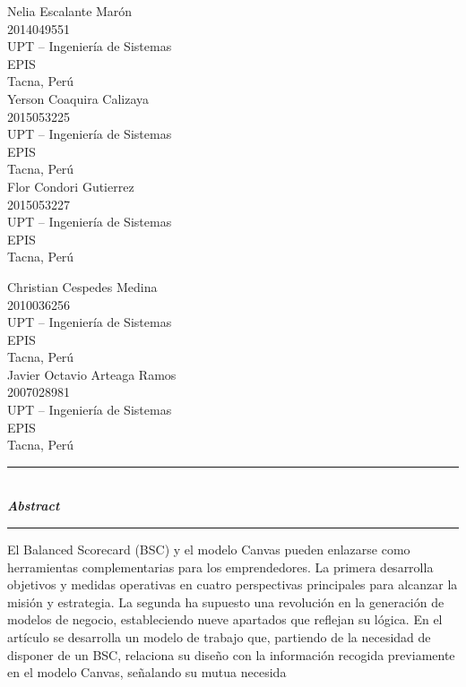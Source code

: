 \documentclass[10pt,a4paper]{article}
\begin{document}
		\begin{multicols}{2}
			\small
			\begin{center}
				Nelia Escalante Marón\\
				2014049551\\
				UPT – Ingeniería de Sistemas\\
				EPIS\\
				Tacna, Perú\\
				\vspace{\baselineskip}
				Yerson Coaquira Calizaya\\
				2015053225\\
				UPT – Ingeniería de Sistemas\\  
				EPIS\\
				Tacna, Perú\\                 
				\vspace{\baselineskip}
				Flor Condori Gutierrez\\
				2015053227\\
				UPT – Ingeniería de Sistemas\\  
				EPIS\\	
				Tacna, Perú\\                 
				\columnbreak
				
				\vspace{\baselineskip}
				Christian Cespedes Medina\\
				2010036256\\
				UPT – Ingeniería de Sistemas\\  
				EPIS\\	
				Tacna, Perú\\                 

				\vspace{\baselineskip}
				Javier Octavio Arteaga Ramos \\
				2007028981\\
				UPT – Ingeniería de Sistemas\\  
				EPIS\\	
				Tacna, Perú\\                 

			\end{center}
			\normalsize			
		\end{multicols}
		\vspace{\baselineskip}
	
		\rule{167mm}{0.1mm}\\
		
		\textbf{\textit{\large Abstract}}\rule[1.5mm]{5mm}{0.1mm} El Balanced Scorecard (BSC) y el modelo Canvas pueden enlazarse como herramientas complementarias para los emprendedores. La primera desarrolla objetivos y medidas operativas en cuatro perspectivas principales para alcanzar la misión y estrategia. La segunda ha supuesto una revolución en la generación de modelos de negocio, estableciendo nueve apartados que reflejan su lógica. En el artículo se desarrolla un modelo de trabajo que, partiendo de la necesidad de disponer de un BSC, relaciona su diseño con la información recogida previamente en el modelo Canvas, señalando su mutua necesida\\
		
\end{document}
